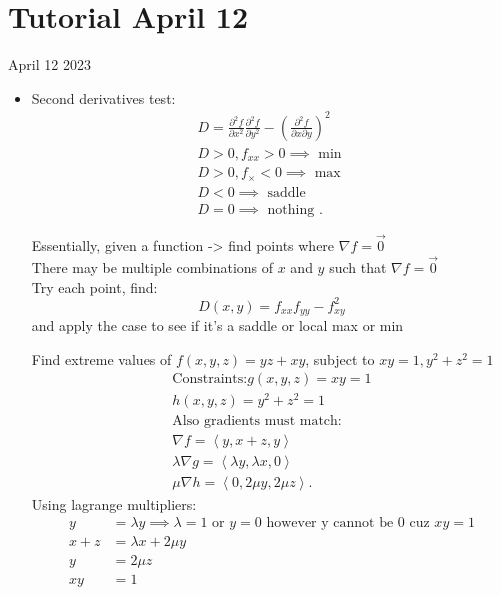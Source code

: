 \section{Tutorial April 12}
April 12 2023
\begin{itemize}
	\item Second derivatives test:
		\begin{align*}
			D = \frac{\partial ^2f}{\partial x^2} \frac{\partial ^2f}{\partial y^2} - \left( \frac{\partial ^2f}{\partial x \partial y}  \right) ^2\\
			D > 0, f_{xx} > 0 \implies \text{ min }\\
			D > 0, f_{\times } < 0 \implies \text{ max }\\
			D < 0 \implies \text{ saddle }\\
			D = 0 \implies \text{ nothing }
		.\end{align*}
		\begin{example}
			Essentially, given a function -> find points where $\nabla f =  \vec{0}$ \\
			There may be multiple combinations of $x$ and $y$ such that $\nabla f = \vec{0}$ \\
			Try each point, find:
			$$
			D(x,y) = f_{xx} f_{yy} - f_{xy}^2
			$$
			and apply the case to see if it's a saddle or local max or min
		\end{example}
		\begin{example}
			Find extreme values of $f\left( x,y,z \right)  = yz + xy$, subject to $xy = 1, y^2+z^2=1$ \\
			\begin{align*}
				\text{Constraints:}
				g\left( x,y,z \right) = xy = 1\\
				h\left( x,y,z \right)  = y^2 + z^2 = 1\\
				\text{Also gradients must match}:\\
				\nabla f = \left<y, x+z, y \right>\\
				\lambda \nabla g = \left<\lambda  y, \lambda  x, 0 \right>\\
				\mu \nabla h = \left<0, 2\mu y, 2\mu z \right>
			.\end{align*}
			Using lagrange multipliers:
			\begin{align*}
				y &= \lambda y \implies \lambda = 1 \text{ or } y = 0 \text{ however y cannot be 0 cuz }xy=1\\
				x + z &= \lambda x + 2 \mu y \\
				y &= 2 \mu z \\
				xy &= 1 \\

\end{align*}
\end{example}
\end{itemize}
